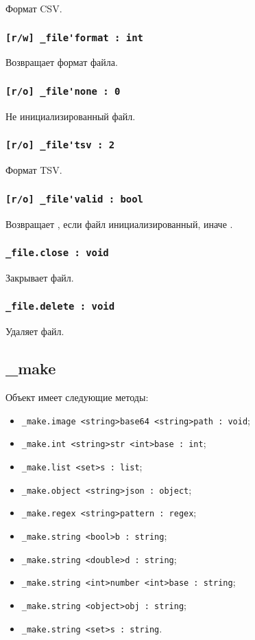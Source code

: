 \documentclass[a4paper, 14pt]{extarticle}
\newenvironment{icItems}
	{ \begin{itemize} [noitemsep,nolistsep] }
	{ \end{itemize} }
\begin{document}
Формат CSV.

\subsubsection{\lstinline|[r/w] _file'format : int|}

Возвращает формат файла.

\subsubsection{\lstinline|[r/o] _file'none : 0|}

Не инициализированный файл.

\subsubsection{\lstinline|[r/o] _file'tsv : 2|}

Формат TSV.

\subsubsection{\lstinline|[r/o] _file'valid : bool|}

Возвращает \true, если файл инициализированный, иначе \false.

\subsubsection{\lstinline|_file.close : void|}

Закрывает файл.

\subsubsection{\lstinline|_file.delete : void|}

Удаляет файл.

\subsection{{\color{orange} \_make}}

Объект \make{} имеет следующие методы:
\begin{icItems}
	\item \lstinline|_make.image <string>base64 <string>path : void|;
	\item \lstinline|_make.int <string>str <int>base : int|;
	\item \lstinline|_make.list <set>s : list|;
	\item \lstinline|_make.object <string>json : object|;
	\item \lstinline|_make.regex <string>pattern : regex|;
	\item \lstinline|_make.string <bool>b : string|;
	\item \lstinline|_make.string <double>d : string|;
	\item \lstinline|_make.string <int>number <int>base : string|;
	\item \lstinline|_make.string <object>obj : string|;
	\item \lstinline|_make.string <set>s : string|.
\end{icItems}
\end{document}
